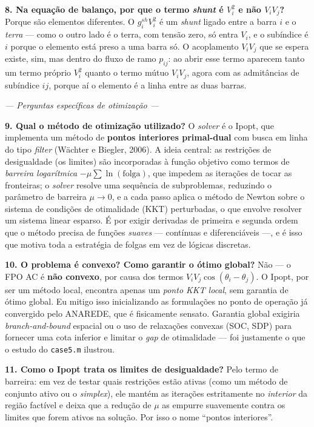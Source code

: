 \documentclass[11pt,a4paper]{article}
\begin{document}
\textbf{8. Na equação de balanço, por que o termo \textit{shunt} é $V_i^2$ e não $V_i V_j$?} Porque são elementos diferentes. O $g^{sh}_i V_i^2$ é um \textit{shunt} ligado entre a barra $i$ e o \emph{terra} --- como o outro lado é o terra, com tensão zero, só entra $V_i$, e o subíndice é $i$ porque o elemento está preso a uma barra só. O acoplamento $V_i V_j$ que se espera existe, sim, mas dentro do fluxo de ramo $p_{ij}$: ao abrir esse termo aparecem tanto um termo próprio $V_i^2$ quanto o termo mútuo $V_i V_j$, agora com as admitâncias de subíndice $ij$, porque aí o elemento é a linha entre as duas barras.

\medskip
\textit{\textcolor{cue}{--- Perguntas específicas de otimização ---}}

\textbf{9. Qual o método de otimização utilizado?} O \textit{solver} é o Ipopt, que implementa um método de \textbf{pontos interiores primal-dual} com busca em linha do tipo \textit{filter} (Wächter e Biegler, 2006). A ideia central: as restrições de desigualdade (os limites) são incorporadas à função objetivo como termos de \emph{barreira logarítmica} $-\mu \sum \ln(\text{folga})$, que impedem as iterações de tocar as fronteiras; o \textit{solver} resolve uma sequência de subproblemas, reduzindo o parâmetro de barreira $\mu \to 0$, e a cada passo aplica o método de Newton sobre o sistema de condições de otimalidade (KKT) perturbadas, o que envolve resolver um sistema linear esparso. É por exigir derivadas de primeira e segunda ordem que o método precisa de funções \emph{suaves} --- contínuas e diferenciáveis ---, e é isso que motiva toda a estratégia de folgas em vez de lógicas discretas.

\textbf{10. O problema é convexo? Como garantir o ótimo global?} Não --- o FPO AC é \textbf{não convexo}, por causa dos termos $V_i V_j \cos(\theta_i-\theta_j)$. O Ipopt, por ser um método local, encontra apenas um \emph{ponto KKT local}, sem garantia de ótimo global. Eu mitigo isso inicializando as formulações no ponto de operação já convergido pelo ANAREDE, que é fisicamente sensato. Garantia global exigiria \textit{branch-and-bound} espacial ou o uso de relaxações convexas (SOC, SDP) para fornecer uma cota inferior e limitar o \textit{gap} de otimalidade --- foi justamente o que o estudo do \texttt{case5.m} ilustrou.

\textbf{11. Como o Ipopt trata os limites de desigualdade?} Pelo termo de barreira: em vez de testar quais restrições estão ativas (como um método de conjunto ativo ou o \textit{simplex}), ele mantém as iterações estritamente no \emph{interior} da região factível e deixa que a redução de $\mu$ as empurre suavemente contra os limites que forem ativos na solução. Por isso o nome ``pontos interiores''.
\end{document}
